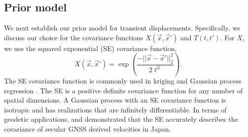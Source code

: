 \subsection{Prior model}\label{ch5:sec:SignalModel}
We next establish our prior model for transient displacements. Specifically, we discuss our choice for the covariance functions $X(\vec{x},\vec{x}')$ and $T(t,t')$. For $X$, we use the squared exponential (SE) covariance function,
\begin{equation}\label{ch5:eq:SE}
X(\vec{x},\vec{x}') = \exp\left(\frac{-||\vec{x} - \vec{x}'||_2^2}{2 \ell^2}\right).
\end{equation}
The SE covariance function is commonly used in kriging \citep[e.g,][]{Cressie1992} and Gaussian process regression \citep[e.g.,][]{Rasmussen2006}. The SE is a positive definite covariance function for any number of spatial dimensions. A Gaussian process with an SE covariance function is isotropic and has realizations that are infinitely differentiable. In terms of geodetic applications, \citet{Kato1998} and \cite{El-Fiky1999} demonstrated that the SE accurately describes the covariance of secular GNSS derived velocities in Japan.     

